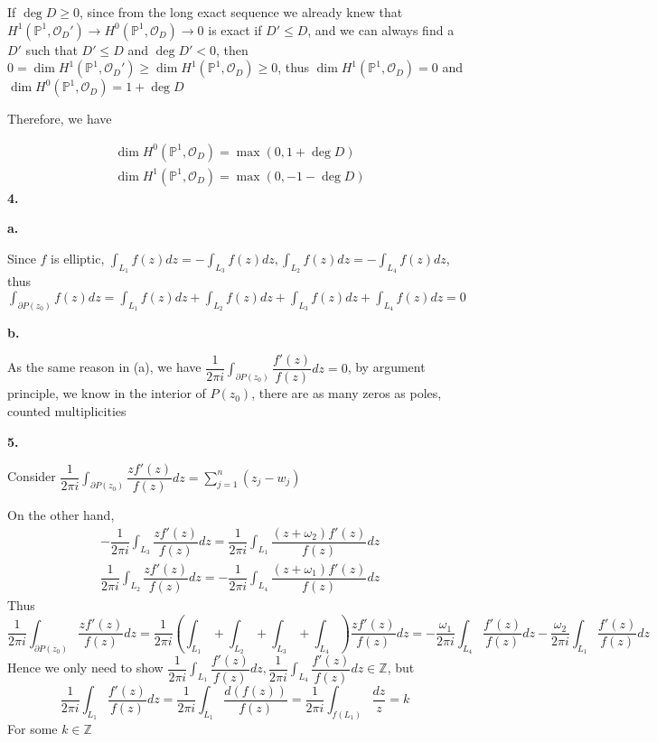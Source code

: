 \documentclass[12pt]{article}
\begin{document}
If $\deg D\geq 0$, since from the long exact sequence we already knew that $H^1(\mathbb{P}^1,\mathcal{O}_D')\rightarrow H^0(\mathbb{P}^1,\mathcal{O}_D)\rightarrow 0$ is exact if $D'\leq D$, and we can always find a $D'$ such that $D'\leq D$ and $\deg D'<0$, then $0=\dim H^1(\mathbb{P}^1,\mathcal{O}_D')\geq \dim H^1(\mathbb{P}^1,\mathcal{O}_D)\geq 0$, thus $\dim H^1(\mathbb{P}^1,\mathcal{O}_D)=0$ and $\dim H^0(\mathbb{P}^1,\mathcal{O}_D)=1+\deg D$ \par
Therefore, we have \par
\[
\begin{aligned}
&\dim H^0(\mathbb{P}^1,\mathcal{O}_D)=\max\left(0,1+\deg D\right) \\
&\dim H^1(\mathbb{P}^1,\mathcal{O}_D)=\max\left(0,-1-\deg D\right)
\end{aligned}
\]
\textbf{4.} \par
\begin{center}
\end{center}
\textbf{a.} \par
Since $f$ is elliptic, $\displaystyle\int_{L_1}f(z)dz=-\int_{L_3}f(z)dz,\int_{L_2}f(z)dz=-\int_{L_4}f(z)dz$, thus $\displaystyle\int_{\partial P(z_0)}f(z)dz=\int_{L_1}f(z)dz+\int_{L_2}f(z)dz+\int_{L_3}f(z)dz+\int_{L_4}f(z)dz=0$ \par
\textbf{b.} \par
As the same reason in (a), we have $\displaystyle\dfrac{1}{2\pi i}\int_{\partial P(z_0)}\dfrac{f'(z)}{f(z)}dz=0$, by argument principle, we know in the interior of $P(z_0)$, there are as many zeros as poles, counted multiplicities \par
\textbf{5.} \par
Consider $\displaystyle\dfrac{1}{2\pi i}\int_{\partial P(z_0)}\dfrac{zf'(z)}{f(z)}dz=\sum_{j=1}^n(z_j-w_j)$ \par
On the other hand, 
\[
\begin{aligned}
&-\dfrac{1}{2\pi i}\int_{L_3}\dfrac{zf'(z)}{f(z)}dz=\dfrac{1}{2\pi i}\int_{L_1}\dfrac{(z+\omega_2)f'(z)}{f(z)}dz \\
&\dfrac{1}{2\pi i}\int_{L_2}\dfrac{zf'(z)}{f(z)}dz=-\dfrac{1}{2\pi i}\int_{L_4}\dfrac{(z+\omega_1)f'(z)}{f(z)}dz
\end{aligned}
\]
Thus
\[
\dfrac{1}{2\pi i}\int_{\partial P(z_0)}\dfrac{zf'(z)}{f(z)}dz
=\dfrac{1}{2\pi i}\left(\int_{L_1}+\int_{L_2}+\int_{L_3}+\int_{L_4}\right)\dfrac{zf'(z)}{f(z)}dz
=-\dfrac{\omega_1}{2\pi i}\int_{L_4}\dfrac{f'(z)}{f(z)}dz-\dfrac{\omega_2}{2\pi i}\int_{L_1}\dfrac{f'(z)}{f(z)}dz
\]
Hence we only need to show $\displaystyle\dfrac{1}{2\pi i}\int_{L_1}\dfrac{f'(z)}{f(z)}dz,\dfrac{1}{2\pi i}\int_{L_4}\dfrac{f'(z)}{f(z)}dz\in\mathbb{Z}$, but
$$\dfrac{1}{2\pi i}\int_{L_1}\dfrac{f'(z)}{f(z)}dz=\dfrac{1}{2\pi i}\int_{L_1}\dfrac{d(f(z))}{f(z)}=\dfrac{1}{2\pi i}\int_{f(L_1)}\dfrac{dz}{z}=k$$
For some $k\in\mathbb{Z}$ \par
\end{document}
